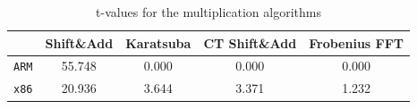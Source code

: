 \begin{table}[H]
    \centering
    \caption{t-values for the multiplication algorithms}
    \begin{tabular}{c|cccc}
        \toprule
        & \textbf{Shift\&Add} & \textbf{Karatsuba} & \textbf{CT Shift\&Add} & \textbf{Frobenius FFT} \\
        \midrule
        \texttt{ARM} & 55.748 & 0.000 & 0.000 & 0.000 \\
        \texttt{x86} & 20.936 & 3.644 & 3.371 & 1.232\\
        \bottomrule
    \end{tabular}
    \label{tab:ctmult}
\end{table}